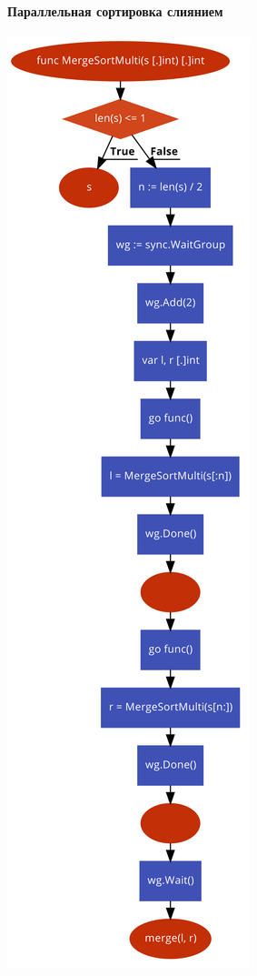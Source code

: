 \documentclass[utf8x, 12pt]{G7-32} %
\begin{document}
\newpage

\paragraph{Параллельная сортировка слиянием}
\begin{center}
	\includegraphics[scale=0.32]{images/mergeSortMulti.png}
\end{center}
\end{document}
